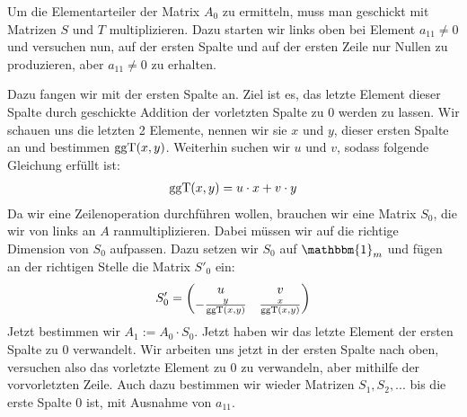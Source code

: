 \begin{*anmerkung}[Teil 1]
	Um die Elementarteiler der Matrix $A_0$ zu ermitteln, muss man geschickt mit Matrizen $S$ und $T$ multiplizieren. Dazu starten wir links oben bei Element $a_{11}\neq 0$ und versuchen nun, auf der ersten Spalte und auf der ersten Zeile nur Nullen zu produzieren, aber $a_{11}\neq 0$ zu erhalten.
	
	 Dazu fangen wir mit der ersten Spalte an. Ziel ist es, das letzte Element dieser Spalte durch geschickte Addition der vorletzten Spalte zu 0 werden zu lassen. Wir schauen uns die letzten 2 Elemente, nennen wir sie $x$ und $y$, dieser ersten Spalte an und bestimmen $\operatorname{ggT}(x,y)$. Weiterhin suchen wir $u$ und  $v$, sodass folgende Gleichung erfüllt ist:
	\begin{align}
		\operatorname{ggT}(x,y)=u\cdot x + v\cdot y\notag
	\end{align}
	Da wir eine Zeilenoperation durchführen wollen, brauchen wir eine Matrix $S_0$, die wir von links an $A$ ranmultiplizieren. Dabei müssen wir auf die richtige Dimension von $S_0$ aufpassen. Dazu setzen wir $S_0$ auf $\mathbbm{1}_m$ und fügen an der richtigen Stelle die Matrix $S'_0$ ein:
	\begin{align}
		S'_0=\begin{pmatrix}u & v \\ -\frac{y}{\operatorname{ggT}(x,y)} & \frac{x}{\operatorname{ggT}(x,y)}\end{pmatrix}\notag
	\end{align}
	Jetzt bestimmen wir $A_1:=A_0\cdot S_0$. Jetzt haben wir das letzte Element der ersten Spalte zu 0 verwandelt. Wir arbeiten uns jetzt in der ersten Spalte nach oben, versuchen also das vorletzte Element zu 0 zu verwandeln, aber mithilfe der vorvorletzten Zeile. Auch dazu bestimmen wir wieder Matrizen $S_1,S_2,...$ bis die erste Spalte 0 ist, mit Ausnahme von $a_{11}$. 
\end{*anmerkung}
